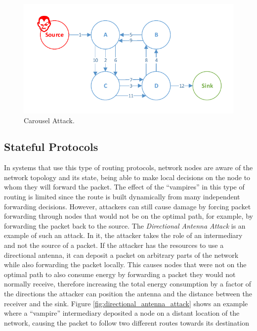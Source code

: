 \documentclass{llncs}
\begin{document}
\begin{figure}[h]
  \centering
  \includegraphics[width=0.9\linewidth]{figures/Carousel_Attack.pdf}
  \caption{Carousel Attack.}
  \label{fig:carousel_attack}
\end{figure}

\subsection{Stateful Protocols}
\label{sec:tables_routing}
In systems that use this type of routing protocols, network nodes are aware of the network topology and its state, being able to make local decisions on the node to whom they will forward the packet. 
The effect of the ``vampires'' in this type of routing is limited since the route is built dynamically from many independent forwarding decisions. 
However, attackers can still cause damage by forcing packet forwarding through nodes that would not be on the optimal path, for example, by forwarding the packet back to the source. 
The \emph{Directional Antenna Attack} is an example of such an attack. 
In it, the attacker takes the role of an intermediary and not the source of a packet. 
If the attacker has the resources to use a directional antenna, it can deposit a packet on arbitrary parts of the network while also forwarding the packet locally. 
This causes nodes that were not on the optimal path to also consume energy by forwarding a packet they would not normally receive, therefore increasing the total energy consumption by a factor of the directions the attacker can position the antenna and the distance between the receiver and the sink. 
Figure \ref{fig:directional_antenna_attack} shows an example where a ``vampire'' intermediary deposited a node on a distant location of the network, causing the packet to follow two different routes towards its destination
\end{document}
